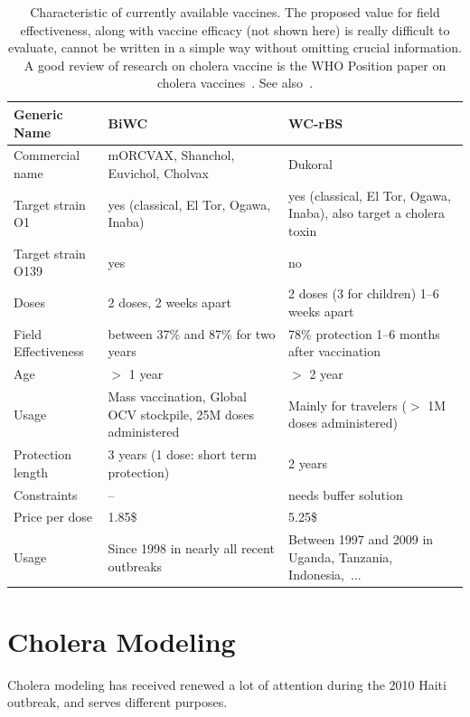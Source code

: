 \begin{table}[h]
\centering\small
\label{tab:prior}
\begin{tabular}{lp{50mm}p{50mm}}
\toprule
Generic Name &  BiWC & WC-rBS\\ 
\midrule
Commercial name   &  mORCVAX, Shanchol,  Euvichol, Cholvax & Dukoral  \\
Target strain O1 &   yes (classical, El Tor, Ogawa, Inaba)& yes (classical, El Tor, Ogawa, Inaba), also  target a cholera toxin  \\
Target strain O139   &  yes &      no     \\
Doses   &  2 doses, 2 weeks apart & 2 doses (3 for children) 1--6 weeks apart  \\
Field Effectiveness  & between 37\% and 87\% for two years & 78\% protection 1--6 months after vaccination\\
Age   &  $>$ 1 year & $>$ 2 year      \\
Usage & Mass vaccination, Global OCV stockpile, 25M doses administered & Mainly for travelers ($>$ 1M doses administered)\\
Protection length & 3 years (1 dose: short term protection) & 2 years\\
Constraints & -- & needs buffer solution\\
Price per dose & 1.85\$ & 5.25\$ \\ 
Usage & Since 1998 in nearly all recent outbreaks & Between 1997 and 2009 in Uganda, Tanzania, Indonesia,~... \\
\bottomrule
\end{tabular}
\caption{Characteristic of currently available vaccines. The proposed value for field effectiveness, along with vaccine efficacy (not shown here) is really difficult to evaluate, cannot be written in a simple way without omitting crucial information. A good review of research on cholera vaccine is the WHO Position paper on cholera vaccines~. See also~\parencite{WHO:BackgroundPaperIntegration:2009,Luquero:UseVibrioCholerae:2014,Qadri:EfficacySingledoseRegimen:2018,Bi:ProtectionCholeraKilled:2017,Azman:ImpactOneDoseTwoDose:2015,Tohme:OralCholeraVaccine:2015}.}
\label{tab:vacc}
\end{table}



\section{Cholera Modeling}
Cholera modeling has received renewed a lot of attention during the 2010 Haiti outbreak, and serves different purposes. 

